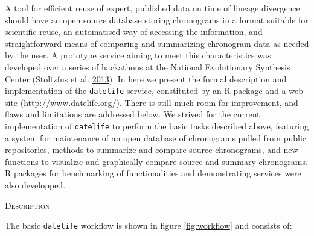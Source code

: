 \documentclass[]{article}
\begin{document}
A tool for efficient reuse of expert, published data on time of lineage divergence should have an open source database storing chronograms in a format suitable for scientific reuse, an automatised way of accessing the information, and straightforward means of comparing and summarizing chronogram data as needed by the user.
A prototype service aiming to meet this characteristics was developed over a series of hackathons at the National Evolutionary Synthesis Center (Stoltzfus et al. \protect\hyperlink{ref-Stoltzfus2013}{2013}).
In here we present the formal description and implementation of the \texttt{datelife} service, constituted by an R package and a web site (\url{http://www.datelife.org/}). There is still much room for improvement, and flaws and limitations are addressed below. We strived for the current implementation of \texttt{datelife} to perform the basic tasks described above, featuring a system for maintenance of an open database of chronograms pulled from public repositories, methods to summarize and compare source chronograms, and new functions to visualize and graphically compare source and summary chronograms.
R packages for benchmarking of functionalities and demonstrating services were also developped.

\begin{center}
\textsc{Description}
\end{center}

The basic \texttt{datelife} workflow is shown in figure \ref{fig:workflow} and consists of:
\end{document}
